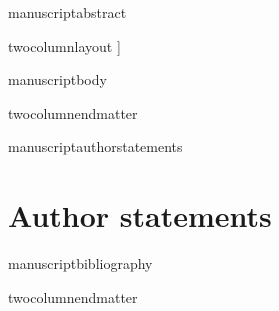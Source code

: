 \documentclass[paper=a4,twocolumn,fontsize=11pt]{article}
\begin{document}
	\ifcsname manuscriptabstract\endcsname
		
	\fi
	\vspace{8mm}
	
\ifcsname twocolumnlayout\endcsname
	]
\fi



\normalsize

\ifcsname manuscriptbody\endcsname
	\noindent %
	
\fi


  


\setlength{\columnseprule}{0pt} %
\ifcsname twocolumnendmatter\endcsname
	\begin{multicols}{2}
\fi
	
\ifcsname manuscriptauthorstatements\endcsname
	
	\section*{Author statements}
	
\fi




\ifcsname manuscriptbibliography\endcsname
	\renewcommand{\bibname}{References} %
	
\fi

\ifcsname twocolumnendmatter\endcsname
	\end{multicols}
\fi
\end{document}
